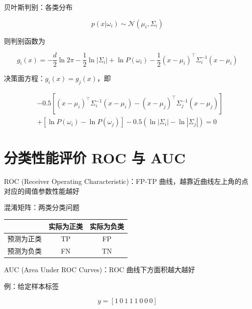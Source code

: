 \documentclass[openany,a4paper,12pt]{ctexbook}
\theoremstyle{kaiti}
\theoremstyle{normal}
\begin{document}
贝叶斯判别：各类分布

\begin{equation}
p\left(x|\omega_i \right)\sim \mathcal{N} \left(\mu_i,\Sigma_i \right)
\end{equation}

则判别函数为

\begin{equation}
g_i(x)=-\frac{d}{2}\ln 2\pi -\frac{1}{2}\ln |\Sigma_i|+\ln P\left(\omega_i \right)-\frac{1}{2}\left(x-\mu_i \right)^{\top}\Sigma_{i}^{-1}\left(x-\mu_i \right)
\end{equation}

决策面方程：$g_i(x)=g_j(x)$，即

\begin{equation}
\begin{aligned}
  &-0.5\left[\left(x-\mu_i \right)^{\top}\Sigma_{i}^{-1}\left(x-\mu_i \right)-\left(x-\mu_j \right)^{\top}\Sigma_{j}^{-1}\left(x-\mu_j \right)\right]\\
  &+\left[\ln P\left(\omega_i \right)-\ln P\left(\omega_j \right)\right] -0.5\left(\ln |\Sigma_i|-\ln |\Sigma_j| \right)=0
\end{aligned}
\end{equation}

\section{分类性能评价 ROC 与 AUC}

ROC (Receiver Operating Characteristic)：FP-TP 曲线，越靠近曲线左上角的点对应的阈值参数性能越好

混淆矩阵：两类分类问题

\begin{table}
  \centering
  \begin{tabular}{ccc}
    \hline
           & 实际为正类 & 实际为负类   \\ \hline
     预测为正类 & TP    & FP     \\
     预测为负类 & FN    & TN     \\ \hline
  \end{tabular}
\end{table}

AUC (Area Under ROC Curves)：ROC 曲线下方面积越大越好

例：给定样本标签 

\begin{equation}
y = [1~0~1~1~1~0~0~0]
\end{equation}
\end{document}
